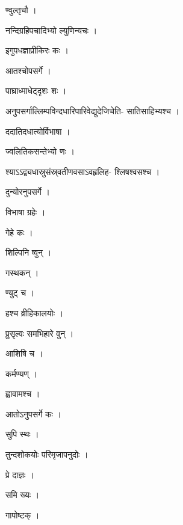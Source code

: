 \documentclass[10pt, openany]{book}
\begin{document}
\noindent ण्वुल्तृचौ ।

\noindent नन्दिग्रहिपचादिभ्यो ल्युणिन्यचः ।

\noindent इगुपधज्ञाप्रीकिरः कः ।

\noindent आतश्चोपसर्गे ।

\noindent पाघ्राध्माधेट्दृशः शः ।

\noindent अनुपसर्गाल्लिम्पविन्दधारिपारिवेद्युदेजिचेति- सातिसाहिभ्यश्च ।

\noindent ददातिदधात्योर्विभाषा ।

\noindent ज्वलितिकसन्तेभ्यो णः ।

\noindent श्याऽऽद्व्यधास्रुसंस्र्वतीणवसाऽवहृलिह- श्लिषश्वसश्च ।

\noindent दुन्योरनुपसर्गे ।

\noindent विभाषा ग्रहेः ।

\noindent गेहे कः ।

\noindent शिल्पिनि ष्वुन् ।

\noindent गस्थकन् ।

\noindent ण्युट् च ।

\noindent हश्च व्रीहिकालयोः ।

\noindent प्रुसृल्वः समभिहारे वुन् ।

\noindent आशिषि च ।

\noindent कर्मण्यण् ।

\noindent ह्वावामश्च ।

\noindent आतोऽनुपसर्गे कः ।

\noindent सुपि स्थः ।

\noindent तुन्दशोकयोः परिमृजापनुदोः ।

\noindent प्रे दाज्ञः ।

\noindent समि ख्यः ।

\noindent गापोष्टक् ।
\end{document}
